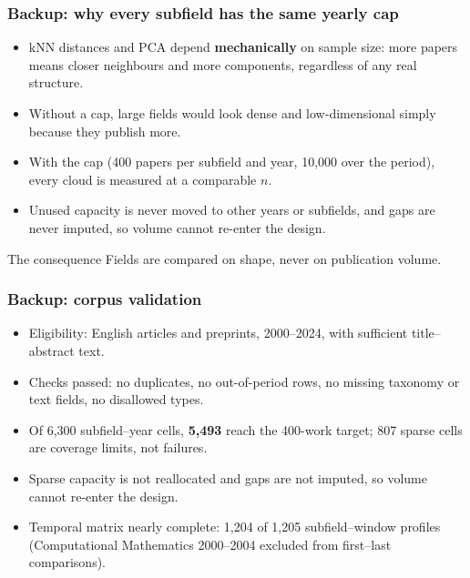 \documentclass[
	11pt, %
	aspectratio=169, %
]{beamer}
\begin{document}
\begin{frame}
	\frametitle{Backup: why every subfield has the same yearly cap}

	\begin{itemize}
		\setlength{\itemsep}{0.6em}
		\item kNN distances and PCA depend \textbf{mechanically} on sample size: more papers means closer neighbours and more components, regardless of any real structure.
		\item Without a cap, large fields would look dense and low-dimensional simply because they publish more.
		\item With the cap (400 papers per subfield and year, 10{,}000 over the period), every cloud is measured at a comparable $n$.
		\item Unused capacity is never moved to other years or subfields, and gaps are never imputed, so volume cannot re-enter the design.
	\end{itemize}

	\medskip

	\begin{block}{The consequence}
		Fields are compared on shape, never on publication volume.
	\end{block}
\end{frame}


\begin{frame}
	\frametitle{Backup: corpus validation}

	\begin{itemize}
		\setlength{\itemsep}{0.55em}
		\item Eligibility: English articles and preprints, 2000--2024, with sufficient title--abstract text.
		\item Checks passed: no duplicates, no out-of-period rows, no missing taxonomy or text fields, no disallowed types.
		\item Of 6{,}300 subfield--year cells, \textbf{5{,}493} reach the 400-work target; 807 sparse cells are coverage limits, not failures.
		\item Sparse capacity is \alert{not} reallocated and gaps are \alert{not} imputed, so volume cannot re-enter the design.
		\item Temporal matrix nearly complete: 1{,}204 of 1{,}205 subfield--window profiles (Computational Mathematics 2000--2004 excluded from first--last comparisons).
	\end{itemize}
\end{frame}
\end{document}
